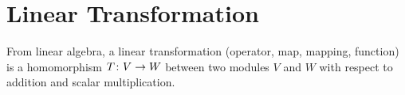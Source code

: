 \section{Linear Transformation}
From linear algebra,
a linear transformation (operator, map, mapping, function) is
a homomorphism \(T \colon V \to W\) between two modules \(V\) and \(W\)
with respect to addition and scalar multiplication.

